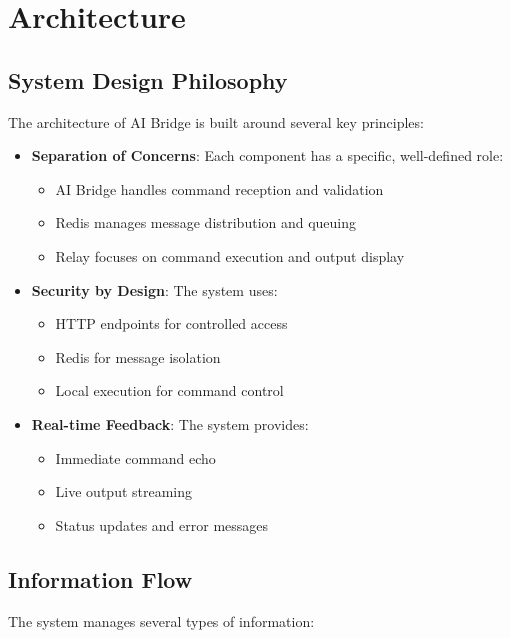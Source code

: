\documentclass{article}
\begin{document}
\section{Architecture}

\subsection{System Design Philosophy}
The architecture of AI Bridge is built around several key principles:

\begin{itemize}
    \item \textbf{Separation of Concerns}: Each component has a specific, well-defined role:
    \begin{itemize}
        \item AI Bridge handles command reception and validation
        \item Redis manages message distribution and queuing
        \item Relay focuses on command execution and output display
    \end{itemize}
    
    \item \textbf{Security by Design}: The system uses:
    \begin{itemize}
        \item HTTP endpoints for controlled access
        \item Redis for message isolation
        \item Local execution for command control
    \end{itemize}
    
    \item \textbf{Real-time Feedback}: The system provides:
    \begin{itemize}
        \item Immediate command echo
        \item Live output streaming
        \item Status updates and error messages
    \end{itemize}
\end{itemize}

\subsection{Information Flow}
The system manages several types of information:
\end{document}

